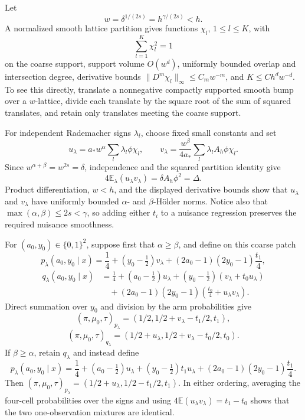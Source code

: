 Let
\[
 w=\delta^{1/(2s)}=h^{\gamma/(2s)}<h.
\]
A normalized smooth lattice partition gives functions \(\chi_l\), \(1\le l\le K\), with
\[
 \sum_{l=1}^K\chi_l^2=1
\]
on the coarse support, support volume \(O(w^d)\), uniformly bounded overlap and intersection degree, derivative bounds \(\|D^m\chi_l\|_\infty\le C_mw^{-m}\), and \(K\le Ch^dw^{-d}\). To see this directly, translate a nonnegative compactly supported smooth bump over a \(w\)-lattice, divide each translate by the square root of the sum of squared translates, and retain only translates meeting the coarse support.

For independent Rademacher signs \(\lambda_l\), choose fixed small constants and set
\[
 u_\lambda=a_*w^\alpha\sum_l\lambda_l\phi\chi_l,
 \qquad
 v_\lambda=\frac{w^\beta}{4a_*}
 \sum_l\lambda_lA_h\phi\chi_l.
\]
Since \(w^{\alpha+\beta}=w^{2s}=\delta\), independence and the squared partition identity give
\[
 4\mathbb E_\lambda(u_\lambda v_\lambda)
 =\delta A_h\phi^2=\Delta.
\]
Product differentiation, \(w<h\), and the displayed derivative bounds show that \(u_\lambda\) and \(v_\lambda\) have uniformly bounded \(\alpha\)- and \(\beta\)-Hölder norms. Notice also that \(\max(\alpha,\beta)\le2s<\gamma\), so adding either \(t_i\) to a nuisance regression preserves the required nuisance smoothness.

For \((a_0,y_0)\in\{0,1\}^2\), suppose first that \(\alpha\ge\beta\), and define on this coarse patch
\[
 p_\lambda(a_0,y_0\mid x)=\frac14+(y_0-\tfrac12)v_\lambda
 +(2a_0-1)(2y_0-1)\frac{t_1}{4},
\]
\[
 \begin{aligned}
 q_\lambda(a_0,y_0\mid x)
 &=\frac14+(a_0-\tfrac12)u_\lambda
 +(y_0-\tfrac12)(v_\lambda+t_0u_\lambda)\\
 &\quad +(2a_0-1)(2y_0-1)
 \left(\frac{t_0}{4}+u_\lambda v_\lambda\right).
 \end{aligned}
\]
Direct summation over \(y_0\) and division by the arm probabilities give
\[
 (\pi,\mu_0,\tau)_{p_\lambda}
 =(1/2,1/2+v_\lambda-t_1/2,t_1),
\]
\[
 (\pi,\mu_0,\tau)_{q_\lambda}
 =(1/2+u_\lambda,1/2+v_\lambda-t_0/2,t_0).
\]
If \(\beta\ge\alpha\), retain \(q_\lambda\) and instead define
\[
 p_\lambda(a_0,y_0\mid x)=\frac14+(a_0-\tfrac12)u_\lambda
 +(y_0-\tfrac12)t_1u_\lambda
 +(2a_0-1)(2y_0-1)\frac{t_1}{4}.
\]
Then \((\pi,\mu_0,\tau)_{p_\lambda}=(1/2+u_\lambda,1/2-t_1/2,t_1)\). In either ordering, averaging the four-cell probabilities over the signs and using \(4\mathbb E(u_\lambda v_\lambda)=t_1-t_0\) shows that the two one-observation mixtures are identical.

